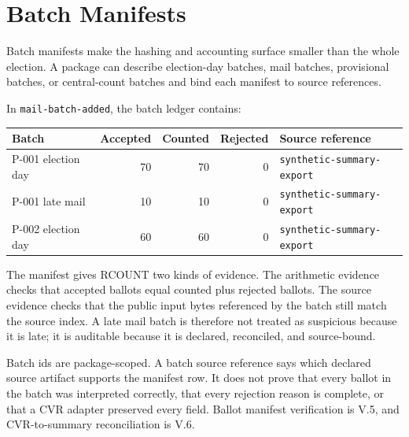\section{Batch Manifests}

Batch manifests make the hashing and accounting surface smaller than the whole
election. A package can describe election-day batches, mail batches,
provisional batches, or central-count batches and bind each manifest to source
references.

In \texttt{mail-batch-added}, the batch ledger contains:

\begin{center}
\small
\begin{tabularx}{\textwidth}{lrrrX}
\toprule
Batch & Accepted & Counted & Rejected & Source reference \\
\midrule
P-001 election day & 70 & 70 & 0 & \texttt{synthetic-summary-export} \\
P-001 late mail & 10 & 10 & 0 & \texttt{synthetic-summary-export} \\
P-002 election day & 60 & 60 & 0 & \texttt{synthetic-summary-export} \\
\bottomrule
\end{tabularx}
\end{center}

The manifest gives RCOUNT two kinds of evidence. The arithmetic evidence checks
that accepted ballots equal counted plus rejected ballots. The source evidence
checks that the public input bytes referenced by the batch still match the
source index. A late mail batch is therefore not treated as suspicious because
it is late; it is auditable because it is declared, reconciled, and source-bound.

Batch ids are package-scoped. A batch source reference says which declared
source artifact supports the manifest row. It does not prove that every ballot
in the batch was interpreted correctly, that every rejection reason is complete,
or that a CVR adapter preserved every field. Ballot manifest verification is
V.5, and CVR-to-summary reconciliation is V.6.
